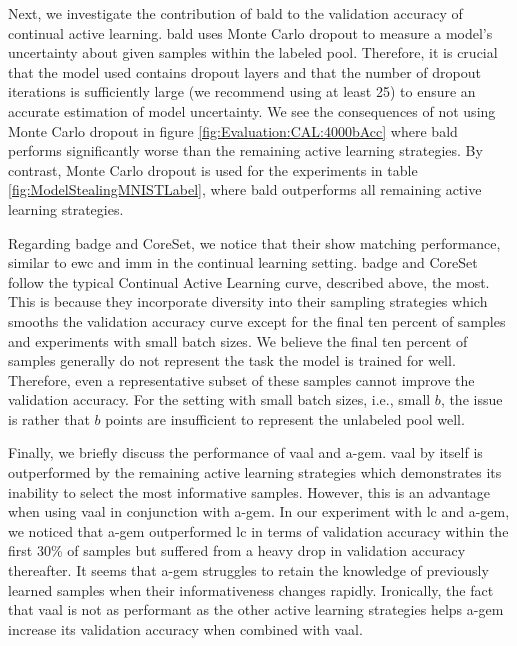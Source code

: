 Next, we investigate the contribution of \gls{bald} to the validation accuracy of continual active learning. \gls{bald} uses Monte Carlo dropout to measure a 
model's uncertainty about given samples within the labeled pool. Therefore, it is crucial that the model used contains dropout layers and that the number of dropout 
iterations is sufficiently large (we recommend using at least 25) to ensure an accurate estimation of model uncertainty. We see the consequences of 
not using Monte Carlo dropout in figure \ref{fig:Evaluation:CAL:4000bAcc} where \gls{bald} performs significantly worse than the remaining active learning
strategies. By contrast, Monte Carlo dropout is used for the experiments in table \ref{fig:ModelStealingMNISTLabel}, where \gls{bald} outperforms all remaining
active learning strategies. \par
Regarding \gls{badge} and CoreSet, we notice that their show matching performance, similar to \gls{ewc} and \gls{imm} in the continual learning setting. \gls{badge}
and CoreSet follow the typical Continual Active Learning curve, described above, the most. This is because they incorporate diversity into their
sampling strategies which smooths the validation accuracy curve except for the final ten percent of samples and experiments with small batch sizes. We believe the
final ten percent of samples generally do not represent the task the model is trained for well. Therefore, even a representative subset of these samples cannot
improve the validation accuracy. For the setting with small batch sizes, i.e., small $b$, the issue is rather that $b$ points are insufficient to represent
the unlabeled pool well. \par
Finally, we briefly discuss the performance of \gls{vaal} and \gls{a-gem}. \gls{vaal} by itself is outperformed by the remaining active
learning strategies which demonstrates its inability to select the most informative samples. However, this is an advantage when using \gls{vaal} in conjunction
with \gls{a-gem}. In our experiment with \gls{lc} and \gls{a-gem}, we noticed that \gls{a-gem} outperformed \gls{lc} in terms of validation accuracy within the first 30\%
of samples but suffered from a heavy drop in validation accuracy thereafter. It seems that \gls{a-gem} struggles to retain the knowledge of previously learned samples when
their informativeness changes rapidly. Ironically, the fact that \gls{vaal} is not as performant as the other active learning strategies helps \gls{a-gem} increase its
validation accuracy when combined with \gls{vaal}. \par

